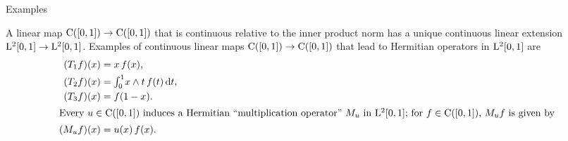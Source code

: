 \documentclass[main.tex]{subfiles}
\begin{document}
\begin{psec}{5.5}{Examples}
\begin{enumerate}
A linear map $\mathrm{C}([0,1])\rightarrow\mathrm{C}([0,1])$
that is continuous relative to the inner product norm
has a unique continuous linear extension
$\mathrm{L}^2[0,1]\rightarrow\mathrm{L}^2[0,1]$.
Examples of continuous linear maps
$\mathrm{C}([0,1])\rightarrow\mathrm{C}([0,1])$ that
lead to Hermitian operators in $\mathrm{L}^2[0,1]$ are
\begin{align*}
(T_1 f)(x) &= x\,f(x)\htam{,} \\
(T_2 f)(x) &= \textstyle{\int_0^1} x\wedge t\,f(t)\,\mathrm{d}t \htam{,} \\
(T_3 f)(x) &= f(1-x)\htam{.} \\%
\intertext{%
Every $u\in\Cont{[0,1]}$ induces a Hermitian 
``multiplication operator''~$M_u$
in $\Leb^2[0,1]$;
for $f\in \Cont{[0,1]}$,
$M_uf$ is given by
}%
(M_uf)(x) &= u(x)\,f(x)\htam{.}
\end{align*}
\end{enumerate}
\end{psec}
%
%
\end{document}
